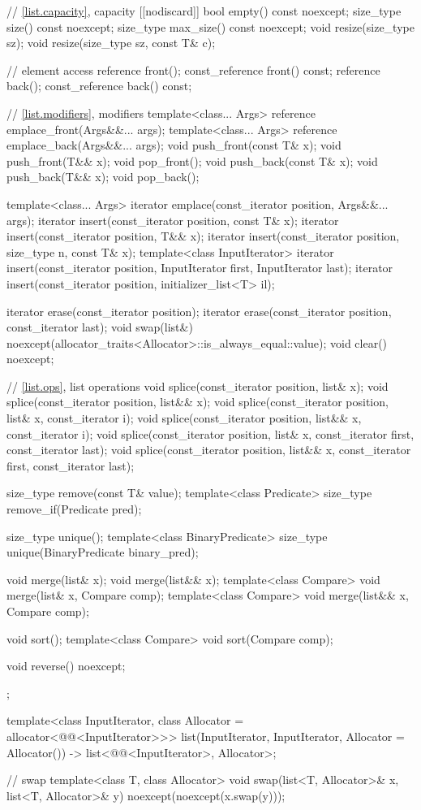 \begin{codeblock}
{{    // \ref{list.capacity}, capacity
    [[nodiscard]] bool empty() const noexcept;
    size_type size() const noexcept;
    size_type max_size() const noexcept;
    void      resize(size_type sz);
    void      resize(size_type sz, const T& c);

    // element access
    reference       front();
    const_reference front() const;
    reference       back();
    const_reference back() const;

    // \ref{list.modifiers}, modifiers
    template<class... Args> reference emplace_front(Args&&... args);
    template<class... Args> reference emplace_back(Args&&... args);
    void push_front(const T& x);
    void push_front(T&& x);
    void pop_front();
    void push_back(const T& x);
    void push_back(T&& x);
    void pop_back();

    template<class... Args> iterator emplace(const_iterator position, Args&&... args);
    iterator insert(const_iterator position, const T& x);
    iterator insert(const_iterator position, T&& x);
    iterator insert(const_iterator position, size_type n, const T& x);
    template<class InputIterator>
      iterator insert(const_iterator position, InputIterator first, InputIterator last);
    iterator insert(const_iterator position, initializer_list<T> il);

    iterator erase(const_iterator position);
    iterator erase(const_iterator position, const_iterator last);
    void     swap(list&) noexcept(allocator_traits<Allocator>::is_always_equal::value);
    void     clear() noexcept;

    // \ref{list.ops}, list operations
    void splice(const_iterator position, list& x);
    void splice(const_iterator position, list&& x);
    void splice(const_iterator position, list& x, const_iterator i);
    void splice(const_iterator position, list&& x, const_iterator i);
    void splice(const_iterator position, list& x, const_iterator first, const_iterator last);
    void splice(const_iterator position, list&& x, const_iterator first, const_iterator last);

    size_type remove(const T& value);
    template<class Predicate> size_type remove_if(Predicate pred);

    size_type unique();
    template<class BinaryPredicate>
      size_type unique(BinaryPredicate binary_pred);

    void merge(list& x);
    void merge(list&& x);
    template<class Compare> void merge(list& x, Compare comp);
    template<class Compare> void merge(list&& x, Compare comp);

    void sort();
    template<class Compare> void sort(Compare comp);

    void reverse() noexcept;
  };

  template<class InputIterator, class Allocator = allocator<@@<InputIterator>>>
    list(InputIterator, InputIterator, Allocator = Allocator())
      -> list<@@<InputIterator>, Allocator>;

  // swap
  template<class T, class Allocator>
    void swap(list<T, Allocator>& x, list<T, Allocator>& y)
      noexcept(noexcept(x.swap(y)));
}
\end{codeblock}

